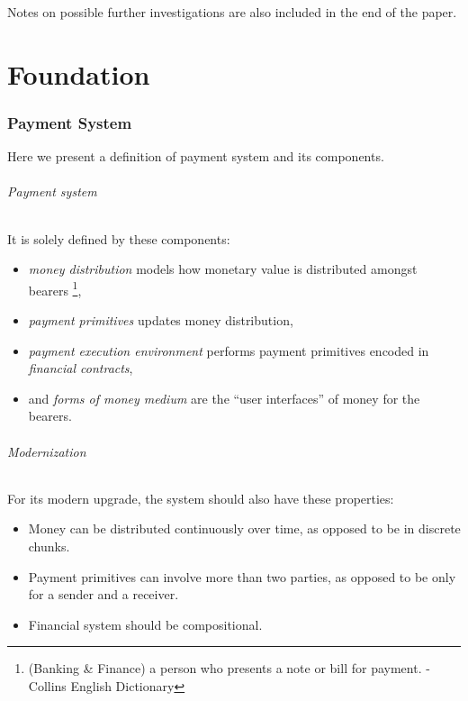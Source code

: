 Notes on possible further investigations are also included in the end of the paper.

\part{Foundation}\label{part:foundation}

\section{Payment System}

Here we present a definition of payment system and its components.

\paragraph{Payment system}

It is solely defined by these components:

\begin{itemize}
    \item \textit{money distribution} models how monetary value is distributed amongst
bearers \footnote{(Banking \& Finance) a person who presents a note or bill for payment. - Collins
English Dictionary},

    \item \textit{payment primitives} updates money distribution,

    \item \textit{payment execution environment} performs payment primitives encoded
    in \textit{financial contracts},

    \item and \textit{forms of money medium} are the ``user interfaces'' of money for the bearers.
\end{itemize}

\paragraph{Modernization}

For its modern upgrade, the system should also have these properties:

\begin{itemize}
    \item Money can be distributed continuously over time, as opposed to be in discrete chunks.

    \item Payment primitives can involve more than two parties, as opposed to be only for a sender
and a receiver.

    \item Financial system should be compositional.
\end{itemize}

